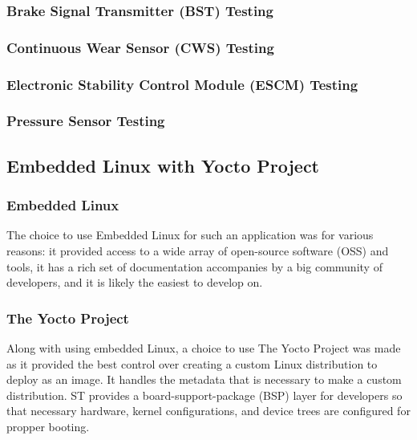 \documentclass[12pt]{article}
\begin{document}
\subsubsection{Brake Signal Transmitter (BST) Testing}

\subsubsection{Continuous Wear Sensor (CWS) Testing}

\subsubsection{Electronic Stability Control Module (ESCM) Testing}

\subsubsection{Pressure Sensor Testing}

\subsection{Embedded Linux with Yocto Project}

\subsubsection{Embedded Linux}
The choice to use Embedded Linux for such an application was for various reasons:
it provided access to a wide array of open-source software (OSS) and tools, it 
has a rich set of documentation accompanies by a big community of developers, and
it is likely the easiest to develop on. 

\subsubsection{The Yocto Project}
Along with using embedded Linux, a choice to use The Yocto Project was made
as it provided the best control over creating a custom Linux distribution to
deploy as an image. It handles the metadata that is necessary to make a custom
distribution. ST provides a board-support-package (BSP) layer for developers 
so that necessary hardware, kernel configurations, and device trees are configured
for propper booting.
\end{document}
